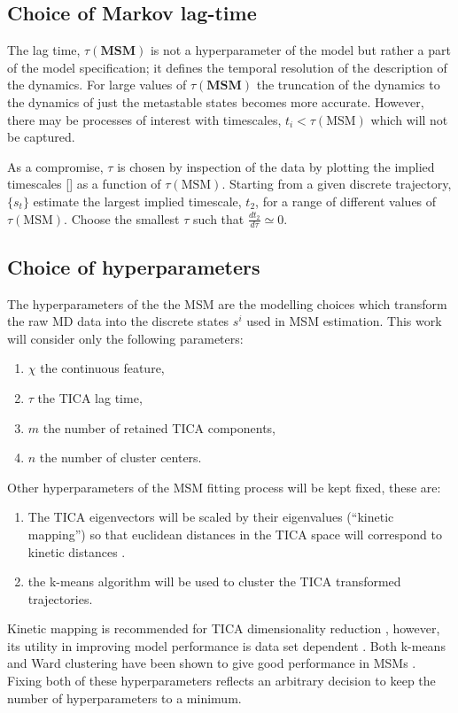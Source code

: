 \subsection{Choice of Markov lag-time}
The lag time, $\tau(\mathbf{MSM})$ is not a hyperparameter of the model but rather a part of the model specification; it defines the temporal resolution of the description of the dynamics. For large values of $\tau(\mathbf{MSM})$ the truncation of the dynamics to the dynamics of just the metastable states becomes more accurate. However, there may be processes of interest with timescales, $t_{i}<\tau(\mathrm{MSM})$ which will not be captured.

As a compromise, $\tau$ is chosen by inspection of the data by plotting the implied timescales [] as a function of $\tau(\mathrm{MSM})$.  Starting from a given discrete trajectory, $\{s_{t}\}$ estimate the largest implied timescale, $t_{2}$, for a range of different values of $\tau(\mathrm{MSM})$. Choose the smallest $\tau$ such that $\frac{d t_{2}}{d \tau} \simeq 0$. 

\subsection{Choice of hyperparameters}
The hyperparameters of the the MSM are the modelling choices which transform the raw MD data into the discrete states $s^{i}$ used in MSM estimation. This work will consider only the following parameters: 
\begin{enumerate}
    \item $\chi$ the continuous feature, 
    \item $\tau$ the TICA lag time, 
    \item $m$ the number of retained TICA components, 
    \item $n$ the number of cluster centers. 
\end{enumerate}
Other hyperparameters of the MSM fitting process will be kept fixed, these are: 
\begin{enumerate}
    \item The TICA eigenvectors will be scaled by their eigenvalues (``kinetic mapping'') so that euclidean distances in the TICA space will correspond to kinetic distances \cite{noeKineticDistanceKinetic2015}.
    \item the k-means algorithm will be used to cluster the TICA transformed trajectories. 
\end{enumerate}
Kinetic mapping is recommended for TICA dimensionality reduction \cite{noeKineticDistanceKinetic2015}, however, its utility in improving model performance is data set dependent \cite{husicOptimizedParameterSelection2016}.  Both k-means and Ward clustering have been shown to give good performance in MSMs \cite{husicWardClusteringImproves2017a}. Fixing both of these hyperparameters reflects an arbitrary decision to keep the number of hyperparameters to a minimum.

